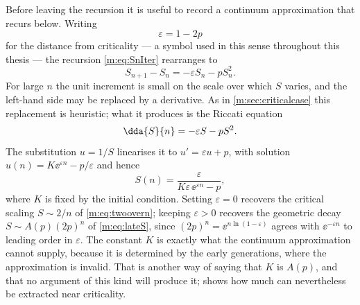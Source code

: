 Before leaving the recursion it is useful to record a continuum approximation that
recurs below. Writing
\begin{equation}
\label{m:eq:epsdef}
\varepsilon = 1-2p
\end{equation}
for the distance from criticality --- a symbol used in this sense throughout this
thesis --- the recursion \cref{m:eq:SnIter} rearranges to
\begin{equation}
\label{m:eq:Sdiff}
S_{n+1}-S_n = -\varepsilon S_n - pS_n^2 .
\end{equation}
For large $n$ the unit increment is small on the scale over which $S$ varies, and
the left-hand side may be replaced by a derivative. As in \cref{m:sec:criticalcase}
this replacement is heuristic; what it produces is the Riccati equation
\begin{equation}
\label{m:eq:riccati}
\dda{S}{n} = -\varepsilon S - pS^2 .
\end{equation}
The substitution $u=1/S$ linearises it to $u' = \varepsilon u + p$, with solution
$u(n) = K\ee^{\varepsilon n}-p/\varepsilon$ and hence
\begin{equation}
\label{m:eq:riccatisol}
S(n) = \frac{\varepsilon}{K\varepsilon\,\ee^{\varepsilon n}-p},
\end{equation}
where $K$ is fixed by the initial condition. Setting $\varepsilon=0$ recovers the
critical scaling $S\sim2/n$ of \cref{m:eq:twoovern}; keeping $\varepsilon>0$
recovers the geometric decay $S\sim A(p)(2p)^n$ of \cref{m:eq:lateS}, since
$(2p)^n = \ee^{n\ln(1-\varepsilon)}$ agrees with $\ee^{-\varepsilon n}$ to leading
order in $\varepsilon$. The constant $K$ is exactly what the continuum
approximation cannot supply, because it is determined by the early generations,
where the approximation is invalid. That is another way of saying that $K$ is
$A(p)$, and that no argument of this kind will produce it; \ChA{} shows how much
can nevertheless be extracted near criticality.

\FloatBarrier
